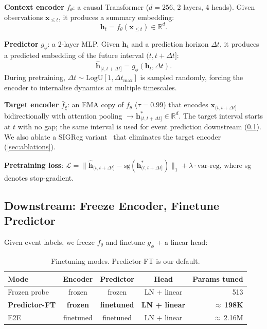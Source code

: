 \documentclass{article}
\newcommand{\R}{\mathbb{R}}
\newcommand{\x}{\mathbf{x}}
\newcommand{\h}{\mathbf{h}}
\newcommand{\loss}{\mathcal{L}}
\newcommand{\encoder}{f_\theta}
\newcommand{\predictor}{g_\phi}
\newcommand{\target}{\bar{f}_\xi}
\begin{document}
\textbf{Context encoder} $\encoder$: a causal Transformer ($d{=}256$, 2 layers, 4 heads). Given observations $\x_{\leq t}$, it produces a summary embedding:
\begin{equation}
  \h_t = \encoder(\x_{\leq t}) \in \R^d.
  \label{eq:encoder}
\end{equation}

\textbf{Predictor} $\predictor$: a 2-layer MLP. Given $\h_t$ and a prediction horizon $\Delta t$, it produces a predicted embedding of the future interval $(t, t{+}\Delta t]$:
\begin{equation}
  \hat{\h}_{(t,t+\Delta t]} = \predictor(\h_t, \Delta t).
  \label{eq:predictor}
\end{equation}
During pretraining, $\Delta t \sim \text{LogU}[1, {\Delta t}_\text{max}]$ is sampled randomly, forcing the encoder to internalise dynamics at multiple timescales.

\textbf{Target encoder} $\target$: an EMA copy of $\encoder$ ($\tau{=}0.99$) that encodes $\x_{(t, t+\Delta t]}$ bidirectionally with attention pooling $\to \h^*_{(t,t+\Delta t]} \in \R^d$. The target interval starts at $t$ with no gap; the same interval is used for event prediction downstream (\cref{sec:downstream}). We also ablate a SIGReg variant~\citep{balestriero2025lejepa} that eliminates the target encoder (\cref{sec:ablations}).

\textbf{Pretraining loss}: $\loss = \|\hat{\h}_{(t,t+\Delta t]} - \text{sg}(\h^*_{(t,t+\Delta t]})\|_1 + \lambda \cdot \text{var-reg}$, where sg denotes stop-gradient.



\subsection{Downstream: Freeze Encoder, Finetune Predictor}
\label{sec:downstream}

Given event labels, we freeze $\encoder$ and finetune $\predictor$ + a linear head:

\begin{table}[h]
  \centering
  \caption{Finetuning modes. Predictor-FT is our default.}
  \label{tab:finetune_modes}
  \small
  \begin{tabular}{@{}lcccr@{}}
    \toprule
    Mode                  & Encoder         & Predictor          & Head                 & Params tuned             \\
    \midrule
    Frozen probe          & frozen          & frozen             & LN + linear          & 513                      \\
    \textbf{Predictor-FT} & \textbf{frozen} & \textbf{finetuned} & \textbf{LN + linear} & \textbf{$\approx$\,198K} \\
    E2E                   & finetuned       & finetuned          & LN + linear          & $\approx$\,2.16M         \\
    \bottomrule
  \end{tabular}
\end{table}
\end{document}
